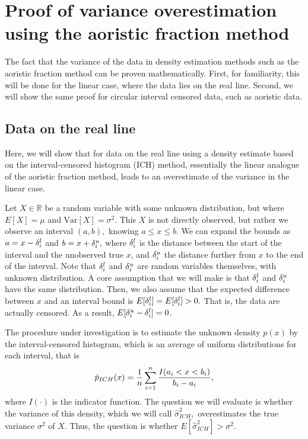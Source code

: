 


\section{Proof of variance overestimation using the aoristic fraction method} \label{proofvar}


The fact that the variance of the data in density estimation methods such as the aoristic fraction method can be proven mathematically. First, for familiarity, this will be done for the linear case, where the data lies on the real line. Second, we will show the same proof for circular interval censored data, such as aoristic data.

\subsection{Data on the real line} \label{proofreal}

Here, we will show that for data on the real line using a density estimate based on the interval-censored histogram (ICH) method, essentially the linear analogue of the aoristic fraction method, leads to an overestimate of the variance in the linear case.

Let $X \in \mathbb{R}$ be a random variable with some unknown distribution, but where $E[X] = \mu$ and $\text{Var}[X] = \sigma^2$. This $X$ is not directly observed, but rather we observe an interval $(a, b),$ knowing $a \leq x \leq b$. We can expand the bounds as $a = x - {\delta^l_i}$ and $b = x + {\delta^u_i},$ where ${\delta^l_i}$ is the distance between the start of the interval and the unobserved true $x$, and ${\delta^u_i}$ the distance further from $x$ to the end of the interval. Note that ${\delta^l_i}$ and ${\delta^u_i}$  are random variables themselves, with unknown distribution. A core assumption that we will make is that ${\delta^l_i}$ and ${\delta^u_i}$ have the same distribution. Then, we also assume that the expected difference between $x$ and an interval bound is $E[{\delta^l_i}] = E[{\delta^l_i}] > 0.$ That is, the data are actually censored. As a result, $E[{\delta^u_i} - {\delta^l_i}] = 0$.


The procedure under investigation is to estimate the unknown density $p(x)$ by the interval-censored histogram, which is an average of uniform distributions for each interval, that is $$\hat{p}_{ICH}(x) = \frac{1}{n}\sum_{i=1}^n \frac{I(a_i < x < b_i)}{b_i - a_i},$$  where $I(\cdot)$ is the indicator function. The question we will evaluate is whether the variance of this density, which we will call $\hat{\sigma}^2_{ICH},$ overestimates the true variance $\sigma^2$ of $X$. Thus, the question is whether $E[\hat{\sigma}^2_{ICH}] > \sigma^2.$

